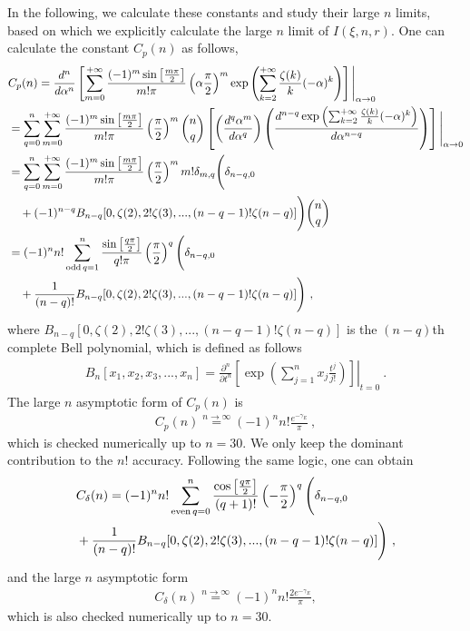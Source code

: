 \documentclass[a4paper,11pt]{article}
\begin{document}
In the following, we calculate
these constants and study their large $n$ limits, based on which we explicitly calculate the large $n$ limit of $I(\xi, n,r)$.  
One can calculate the constant $C_p(n)$ as follows,
\begingroup
\allowdisplaybreaks
\begin{align}\label{eq:Cpexa}
&C_p(n) = \frac{d^n}{d\alpha^n} \left[ \sum_{m=0}^{+\infty} \frac{(-1)^m \sin\left[\frac{m \pi}{2}\right]}{m! \pi}\left(\alpha \frac{\pi}{2}\right)^m \exp\left(\sum_{k=2}^{+\infty} \frac{\zeta(k)}{k}(-\alpha)^{k}\right) \right] \Bigg|_{\alpha \rightarrow 0} \nonumber\\
&= \sum_{q=0}^{n} \sum_{m=0}^{+\infty} \frac{(-1)^m \sin\left[\frac{m \pi}{2}\right]}{m! \pi}\left(\frac{\pi}{2}\right)^m \binom{n}{q} \left[ \left(\frac{d^q\alpha^m}{d \alpha^q}\right) \left( \frac{d^{n-q} \exp\left(\sum_{k=2}^{+\infty} \frac{\zeta(k)}{k}(-\alpha)^{k}\right) }{d \alpha^{n-q}} \right)  \right] \Bigg|_{\alpha \rightarrow 0} \nonumber\\
&= \sum_{q=0}^{n} \sum_{m=0}^{+\infty} \frac{(-1)^m \sin\left[\frac{m \pi}{2}\right]}{m! \pi}\left(\frac{\pi}{2}\right)^m m! \delta_{m,q} \Bigg(\delta_{n-q,0} \Bigg.\nonumber\\
&\Bigg.\quad +(-1)^{n-q}B_{n-q}[0,\zeta(2),2!\zeta(3),...,(n-q-1)!\zeta(n-q)]\Bigg) \binom{n}{q} \nonumber\\
&= (-1)^{n} n! \sum_{{\rm odd} \, q=1}^{n} \frac{\sin\left[\frac{q \pi}{2}\right]}{q! \pi}\left(\frac{\pi}{2}\right)^q \Bigg(\delta_{n-q,0} \Bigg.\nonumber\\
&\Bigg.\quad+ \frac{1}{(n-q)!}B_{n-q}[0,\zeta(2),2!\zeta(3),...,(n-q-1)!\zeta(n-q)]\Bigg) \ ,
\end{align}
\endgroup
where $B_{n-q}[0,\zeta(2),2!\zeta(3),...,(n-q-1)!\zeta(n-q)]$ is the $(n-q)$th complete Bell polynomial, which is defined as follows
\begin{align}
B_{n}[x_1,x_2,x_3,...,x_n] = \left. \frac{\partial^n}{\partial t^n} \left[ \exp \left(\sum_{j=1}^n x_j \frac{t^j}{j !}\right) \right]\right|_{t=0} \ .
\end{align}
The large $n$ asymptotic form of $C_p(n)$ is 
\begin{align}\label{eq:CpLn}
C_p(n) \stackrel{n \rightarrow \infty}{=} (-1)^{n} n! \frac{e^{-\gamma_E}}{\pi} \ ,
\end{align}
which is checked numerically up to $n=30$. We only keep the dominant contribution to the $n!$ accuracy.
Following the same logic, one can obtain
\begin{align}\label{eq:Cdeltaexa}
&C_{\delta}(n) = (-1)^n n! \sum_{{\rm even} \,q=0}^{n} \frac{\cos \left[\frac{q \pi}{2}\right]}{(q+1)!} \left(-\frac{\pi}{2}\right)^q 
\Bigg( \delta_{n-q,0} \Bigg. \nonumber\\
&\Bigg. +\frac{1}{(n-q)!}B_{n-q}[0,\zeta(2),2!\zeta(3),...,(n-q-1)!\zeta(n-q)] \Bigg) \ ,
\end{align}
and the large $n$ asymptotic form
\begin{align}\label{eq:CdeltaLn}
C_{\delta}(n) \stackrel{n \rightarrow \infty}{=} (-1)^{n} n! \frac{2e^{-\gamma_E}}{\pi},
\end{align}
which is also checked numerically up to $n=30$.
\end{document}
